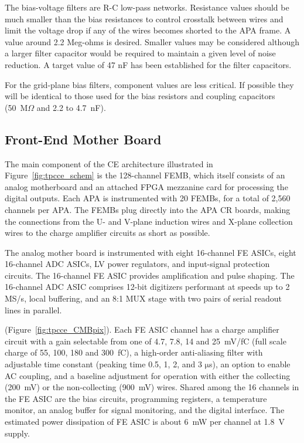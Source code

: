 The bias-voltage filters are R-C low-pass networks.
Resistance values should be much smaller than the bias resistances to control crosstalk between wires
and limit the voltage drop if any of the wires becomes shorted to the APA frame.
A value around 2.2 Meg-ohms is desired.
Smaller values may be considered although a larger filter capacitor would be required to maintain a given level of noise reduction.
A target value of 47 nF has been established for the filter capacitors.

For the grid-plane bias filters, component values are less critical.
If possible they will be identical to those used for the bias resistors and coupling capacitors
(50~M$\Omega$ and 2.2 to 4.7~nF).


\subsection{Front-End Mother Board}
\label{subsec:fe_arch}

The main component of the CE architecture illustrated in Figure~\ref{fig:tpcce_schem} is the 
128-channel FEMB, which itself consists of an analog motherboard and an attached FPGA 
mezzanine card for processing the digital outputs.
Each APA is instrumented with 20 FEMBs, for a total of 2,560 channels per APA.
The FEMBs plug directly into the APA CR boards, making the connections from the U- and V-plane induction wires and 
X-plane collection wires to the charge amplifier circuits as short as possible.

The analog mother board is instrumented with eight 16-channel FE ASICs,
eight 16-channel ADC ASICs, LV power regulators, and input-signal protection circuits.
The 16-channel FE ASIC provides amplification and pulse shaping.
The 16-channel ADC ASIC comprises  12-bit digitizers performant at speeds up to 2 MS/s, local buffering,
and an 8:1 MUX stage with two pairs of serial readout lines in parallel.

 
   (Figure~\ref{fig:tpcce_CMBpix}).
Each FE ASIC channel has a charge amplifier circuit with a gain selectable from one of 4.7, 7.8, 14 and 25~mV/fC
(full scale charge of 55, 100, 180 and 300~fC),
a high-order anti-aliasing filter with adjustable time
constant (peaking time 0.5, 1, 2, and 3 $\mathrm{\mu}$s),
an option to enable AC coupling,
and a baseline adjustment for operation with either the collecting (200~mV) or the non-collecting (900~mV) wires.
Shared among the 16 channels in the FE ASIC are the bias circuits, programming registers,
a temperature monitor, an analog buffer for signal monitoring, and the digital interface.
The estimated power dissipation of FE ASIC is about 6~mW per channel at 1.8~V supply.

